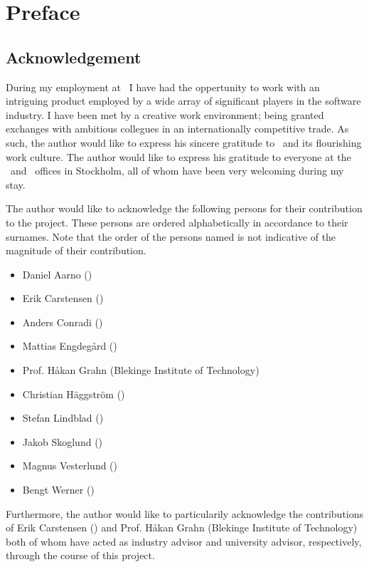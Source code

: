
\chapter*{Preface}
\label{cha:preface}

\section*{Acknowledgement}
\label{sec:preface_acknowledgement}
During my employment at \dvttermintel\ I have had the oppertunity to work with an intriguing product employed by a wide array of significant players in the software industry.
I have been met by a creative work environment; being granted exchanges with ambitious collegues in an internationally competitive trade.
As such, the author would like to express his sincere gratitude to \dvttermintel\ and its flourishing work culture.
The author would like to express his gratitude to everyone at the \dvttermintel\ and \dvttermwindriver\ offices in Stockholm, all of whom have been very welcoming during my stay.

The author would like to acknowledge the following persons for their contribution to the project.
These persons are ordered alphabetically in accordance to their surnames.
Note that the order of the persons named is not indicative of the magnitude of their contribution.

\begin{itemize}[noitemsep]
\item Daniel Aarno (\dvttermintel )
\item Erik Carstensen (\dvttermintel )
\item Anders Conradi (\dvttermintel )
\item Mattias Engdegård (\dvttermintel )
\item Prof. Håkan Grahn (Blekinge Institute of Technology)
\item Christian Häggström (\dvttermintel )
\item Stefan Lindblad (\dvttermintel )
\item Jakob Skoglund (\dvttermwindriver )
\item Magnus Vesterlund (\dvttermwindriver )
\item Bengt Werner (\dvttermintel )
\end{itemize}

Furthermore, the author would like to particularily acknowledge the contributions of Erik Carstensen (\dvttermintel ) and Prof. Håkan Grahn (Blekinge Institute of Technology) both of whom have acted as industry advisor and university advisor, respectively, through the course of this project.

